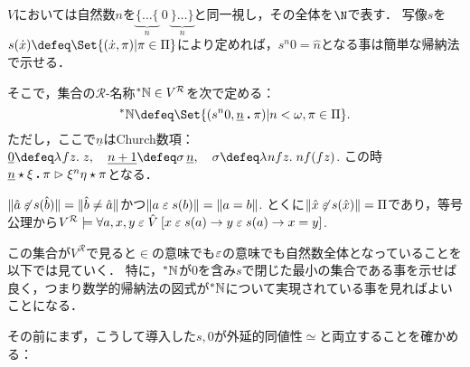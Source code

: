 \documentclass[realisability.tex]{subfiles}
\begin{document}
\begin{definition}
 $V$においては自然数$n$を$\mathopen{\underbrace{\{\dots\{}_{n}}\  0\ \mathclose{\underbrace{\}\dots\}}_{n}}$と同一視し，その全体を$\N$で表す．
 写像$s$を$s(\dot{x}) \defeq \Set{ (\dot{x}, \pi) | \pi \in \Pi}$により定めれば，$s^n 0 = \widehat{n}$となる事は簡単な帰納法で示せる． 

 そこで，集合の$\mathcal{R}$-名称$\mathord{{}^{*}\mathbb{N}} \in V^{\mathcal{R}}$を次で定める：
 \[
  \NN \defeq \Set{ (s^n 0, \num{n} \push \pi) | n < \omega, \pi \in \Pi}.
 \]
 ただし，ここで$\underline{n}$はChurch数項：$\underline{0} \defeq \abs{f z}{z}, \quad \underline{n+1} \defeq \sigma \, \underline{n}, \quad \sigma \defeq \abs{n f z}{n f (f z)}$.
 この時$\underline{n} \mathbin{\star} \xi \mathbin{\boldsymbol{.}} \pi \mathrel{\rhd} \xi^n \eta \mathbin{\star} \pi$となる．
\end{definition}
\begin{remark}
 $\|\hat{a} \not\mathrel{\varepsilon} s(\hat{b})\| = \|\hat{b} \neq \hat{a}\|$かつ$\|a \mathrel{\varepsilon} s(b)\| = \|a = b\|$.
 とくに$\|\hat{x} \not\mathrel{\varepsilon} s(\hat{x})\| = \Pi$であり，等号公理から$V^{\mathcal{R}} \models \forall a, x, y \mathrel{\varepsilon} \hat{V} \: [x \mathrel{\varepsilon} s(a) \to y \mathrel{\varepsilon} s(a) \to x = y]$.
\end{remark}

この集合が$V^{\mathcal{R}}$で見ると$\in$の意味でも$\mathrel{\varepsilon}$の意味でも自然数全体となっていることを以下では見ていく．
特に，$\mathord{{}^{*}\mathbb{N}}$が$0$を含み$s$で閉じた最小の集合である事を示せば良く，つまり数学的帰納法の図式が$\mathord{{}^{*}\mathbb{N}}$について実現されている事を見ればよいことになる．

その前にまず，こうして導入した$s, 0$が外延的同値性$\simeq$と両立することを確かめる：
\end{document}
